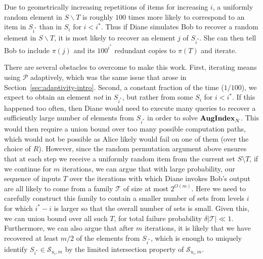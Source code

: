 Due to geometrically increasing repetitions of items for increasing $i$, a uniformly random element in $S\backslash T$ is roughly $100$ times more likely to correspond to an item in $S_{i^*}$ than in $S_i$ for $i<i^*$. Thus if Diane simulates Bob to recover a random element in $S\backslash T$, it is most likely to recover an element $j$ of $S_{i^*}$. She can then tell Bob to include $\pi(j)$ and its $100^{i^*}$ redundant copies to $\pi(T)$ and iterate.

There are several obstacles to overcome to make this work. First, iterating means using $\mathcal P$ adaptively, which was the same issue that arose in Section~\ref{sec:adaptivity-intro}. Second, a constant fraction of the time ($1/100$), we expect to obtain an element {\em not} in $S_{i^*}$, but rather from some $S_i$ for $i<i^*$. If this happened too often, then Diane would need to execute many 
queries to recover a sufficiently large number of elements from $S_{i^*}$ in order to solve $\mathbf{AugIndex}_N$. This would then require a union bound over too many possible computation paths, which would not be possible as Alice likely would fail on one
of them (over the choice of $R$). 
However, since the random permutation argument above ensures that at each step we receive
a uniformly random item from the current set $S \setminus T$, if we continue for $m$ iterations, we can argue that with large probability, our sequence of inputs $T$ over the iterations with which Diane invokes Bob's output are all likely to come from a family $\mathcal T$ of size at most $2^{O(m)}$. Here we need to carefully
construct this family to contain a smaller number of sets from levels $i$ for which $i^*-i$
is larger so that the overall number of sets is small. Given this, we can union bound over all such $T$, for total failure probability $\delta |\mathcal T| \ll 1$. Furthermore, we can also argue that after $m$ iterations, it is likely that we have recovered at least $m/2$ of the elements from $S_{i^*}$, which is enough to uniquely identify $S_{i^*}\in \mathcal S_{u_i,m}$ by the limited intersection property of $\mathcal S_{u_i,m}$.
